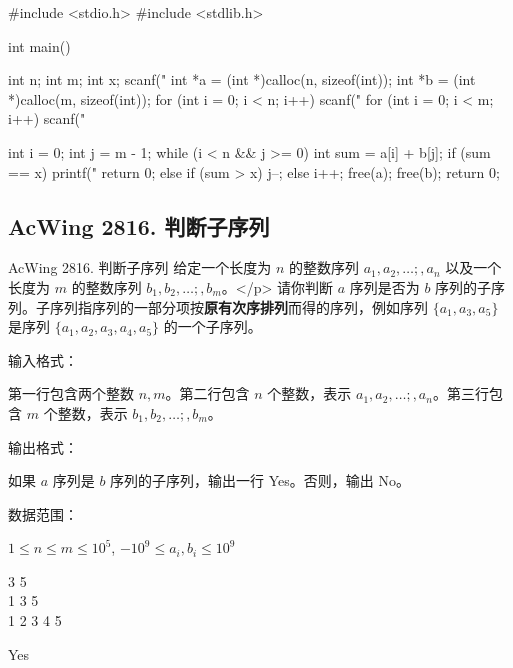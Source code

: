 \begin{mycpptwocol}[数组元素的目标和]
    #include <stdio.h>
    #include <stdlib.h>

    int main()
        {
        int n;
        int m;
        int x;
        scanf("%
        int *a = (int *)calloc(n, sizeof(int));
        int *b = (int *)calloc(m, sizeof(int));
        for (int i = 0; i < n; i++) {
            scanf("%
        }
        for (int i = 0; i < m; i++) {
            scanf("%
        }

        int i = 0;
        int j = m - 1;
        while (i < n && j >= 0) {
            int sum = a[i] + b[j];
            if (sum == x) {
                printf("%
                return 0;
            } else if (sum > x) {
                j--;
            } else {
                i++;
            }
        }
        free(a);
        free(b);
        return 0;
    }
\end{mycpptwocol}

\subsection{AcWing 2816. 判断子序列}
\begin{titledbox}{AcWing 2816. 判断子序列}
    给定一个长度为 $n$ 的整数序列 $a_1,a_2,\dots;,a_n$ 以及一个长度为 $m$ 的整数序列 $b_1,b_2,\dots;,b_m$。</p>
    请你判断 $a$ 序列是否为 $b$ 序列的子序列。子序列指序列的一部分项按\textbf{原有次序排列}而得的序列，例如序列 $\{a_1,a_3,a_5\}$ 是序列 $\{a_1,a_2,a_3,a_4,a_5\}$ 的一个子序列。

    输入格式：

    第一行包含两个整数 $n,m$。第二行包含 $n$ 个整数，表示 $a_1,a_2,\dots;,a_n$。第三行包含 $m$ 个整数，表示 $b_1,b_2,\dots;,b_m$。

    输出格式：

    如果 $a$ 序列是 $b$ 序列的子序列，输出一行 Yes。否则，输出 No。

    数据范围：

    $1 \le n \le m \le 10^5$, $-10^9 \le a_i,b_i \le 10^9$

    \begin{inputblock}
        3 5 \\
        1 3 5 \\
        1 2 3 4 5
    \end{inputblock}
    \begin{outputblock}
        Yes
    \end{outputblock}
\end{titledbox}

